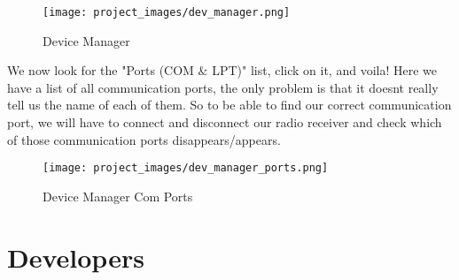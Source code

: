 	\begin{figure}[H]
	\centering
	\texttt{[image: project\_images/dev\_manager.png]}
	 \caption{Device Manager}
	 \label{fig:dev_manager}
	\end{figure}

We now look for the "Ports (COM $\&$ LPT)" list, click on it, and voila! Here we have a list of all communication ports, the only problem is that it doesnt really tell us the name of each of them. So to be able to find our correct communication port, we will have to connect and disconnect our radio receiver and check which of those communication ports disappears/appears.

	\begin{figure}[H]
	\centering
	\texttt{[image: project\_images/dev\_manager\_ports.png]}
	 \caption{Device Manager Com Ports}
	 \label{fig:dev_manager_ports}
	\end{figure}
\newpage
\section{Developers}
